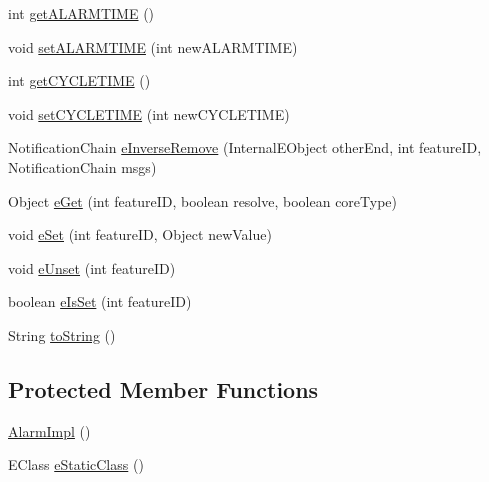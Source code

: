 \begin{DoxyCompactItemize}
\item 
int \hyperlink{classshootingmachineemfmodel_1_1impl_1_1_alarm_impl_ac79556c6b3f364973719c580860200b3}{get\-A\-L\-A\-R\-M\-T\-I\-M\-E} ()
\item 
void \hyperlink{classshootingmachineemfmodel_1_1impl_1_1_alarm_impl_a71ad6d3099df94662fd305268aa4be9a}{set\-A\-L\-A\-R\-M\-T\-I\-M\-E} (int new\-A\-L\-A\-R\-M\-T\-I\-M\-E)
\item 
int \hyperlink{classshootingmachineemfmodel_1_1impl_1_1_alarm_impl_a5bf352e51eec89bd76092fb853ddde24}{get\-C\-Y\-C\-L\-E\-T\-I\-M\-E} ()
\item 
void \hyperlink{classshootingmachineemfmodel_1_1impl_1_1_alarm_impl_abd50bfde6e2d0970b257e0e3876418c4}{set\-C\-Y\-C\-L\-E\-T\-I\-M\-E} (int new\-C\-Y\-C\-L\-E\-T\-I\-M\-E)
\item 
Notification\-Chain \hyperlink{classshootingmachineemfmodel_1_1impl_1_1_alarm_impl_afefab647629dd6e12b2ef1d4b59b8dea}{e\-Inverse\-Remove} (Internal\-E\-Object other\-End, int feature\-I\-D, Notification\-Chain msgs)
\item 
Object \hyperlink{classshootingmachineemfmodel_1_1impl_1_1_alarm_impl_ade1331328d4f6a82a2874e9941420796}{e\-Get} (int feature\-I\-D, boolean resolve, boolean core\-Type)
\item 
void \hyperlink{classshootingmachineemfmodel_1_1impl_1_1_alarm_impl_ac987bb4dbdac6c9d643b70a8a5a673ea}{e\-Set} (int feature\-I\-D, Object new\-Value)
\item 
void \hyperlink{classshootingmachineemfmodel_1_1impl_1_1_alarm_impl_aa27f814c8e6b33d38b386843c7d2c37f}{e\-Unset} (int feature\-I\-D)
\item 
boolean \hyperlink{classshootingmachineemfmodel_1_1impl_1_1_alarm_impl_a3dc038d95cdf700101d4e42dfb0f0b33}{e\-Is\-Set} (int feature\-I\-D)
\item 
String \hyperlink{classshootingmachineemfmodel_1_1impl_1_1_alarm_impl_afd2fa4fce4e047cb1c2f0b1fa6567aa7}{to\-String} ()
\end{DoxyCompactItemize}
\subsection*{Protected Member Functions}
\begin{DoxyCompactItemize}
\item 
\hyperlink{classshootingmachineemfmodel_1_1impl_1_1_alarm_impl_a143a60a89a29b13380beabe5e11d7eea}{Alarm\-Impl} ()
\item 
E\-Class \hyperlink{classshootingmachineemfmodel_1_1impl_1_1_alarm_impl_a4923e39f23595d75a7fe98486d376c45}{e\-Static\-Class} ()
\end{DoxyCompactItemize}
